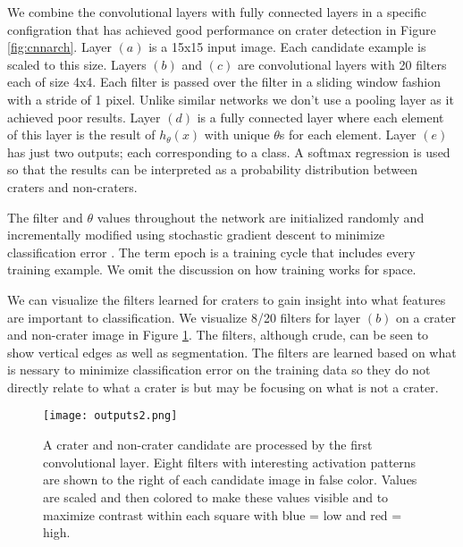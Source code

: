 \documentclass[twoside]{article}
\begin{document}
We combine the convolutional layers with fully connected layers in a specific configration that has achieved good performance on crater detection in Figure \ref{fig:cnnarch}. Layer $(a)$ is a 15x15 input image. Each candidate example is scaled to this size. Layers $(b)$ and $(c)$ are convolutional layers with 20 filters each of size 4x4. Each filter is passed over the filter in a sliding window fashion with a stride of 1 pixel. Unlike similar networks we don't use a pooling layer as it achieved poor results. Layer $(d)$ is a fully connected layer where each element of this layer is the result of $h_\theta(x)$ with unique $\theta$s for each element. Layer $(e)$ has just two outputs; each corresponding to a class. A softmax regression is used so that the results can be interpreted as a probability distribution between craters and non-craters.


The filter and $\theta$ values throughout the network are initialized randomly and incrementally modified using stochastic gradient descent to minimize classification error \cite{krizhevsky_imagenet_2012}. The term epoch is a training cycle that includes every training example. We omit the discussion on how training works for space.


We can visualize the filters learned for craters to gain insight into what features are important to classification. We visualize 8/20 filters for layer $(b)$ on a crater and non-crater image in Figure \ref{fig:filters}. The filters, although crude, can be seen to show vertical edges as well as segmentation. The filters are learned based on what is nessary to minimize classification error on the training data so they do not directly relate to what a crater is but may be focusing on what is not a crater.


\begin{figure}[t]
\begin{center}
  \texttt{[image: outputs2.png]}
  \vspace{-10pt}
  \caption[labelInTOC]{A crater and non-crater candidate are processed by the first convolutional layer. Eight filters with interesting activation patterns are shown to the right of each candidate image in false color.  Values are scaled and then colored to make these values visible and to maximize contrast within each square with blue = low and red = high.}
  \label{fig:filters}
  \vspace{-20pt}
\end{center}
\end{figure}
\end{document}
